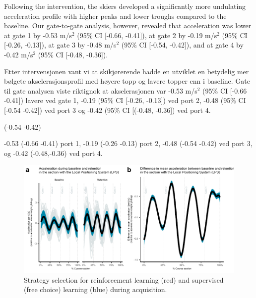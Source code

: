 \documentclass{article}
\begin{document}
Following the intervention, the skiers developed a significantly more undulating acceleration profile with higher peaks and lower troughs compared to the baseline. Our gate-to-gate analysis, however, revealed that acceleration was lower at gate 1 by -0.53  m/s$^2$ (95\% CI [-0.66, -0.41]), at gate 2 by -0.19  m/s$^2$ (95\% CI [-0.26, -0.13]), at gate 3 by -0.48  m/s$^2$ (95\% CI [-0.54, -0.42]), and at gate 4 by -0.42  m/s$^2$  (95\% CI [-0.48, -0.36]). 










Etter intervensjonen vant vi at skikjørerende hadde en utviklet en betydelig mer bølgete akselerasjonsprofil med høyere topp og lavere topper enn i baseline. Gate til gate analysen viste riktignok at akselerasjonen var -0.53  m/s$^2$ (95\% CI [-0.66  -0.41]) lavere ved gate 1,  -0.19  (95\% CI [-0.26, -0.13]) ved port 2, -0.48 (95\% CI [-0.54  -0.42]) ved port 3 og  -0.42 (95\% CI [(-0.48, -0.36]) ved port 4. 

(-0.54  -0.42)


-0.53 (-0.66  -0.41) port 1, -0.19  (-0.26  -0.13) port 2, -0.48  (-0.54  -0.42) ved port 3, og -0.42  (-0.48,-0.36) ved port 4. 




\begin{figure}[H]
\centering
\includegraphics{figurer/figure_acc.pdf}
\caption{Strategy selection for reinforcement learning (red) and supervised (free choice) learning (blue) during acquisition.}\label{fig: acc}
\end{figure}
\end{document}
